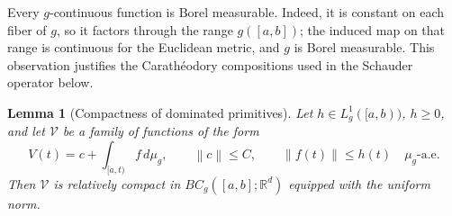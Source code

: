 \documentclass[preprint,12pt]{elsarticle}
\newenvironment{revision}{\begingroup\color{red}}{\endgroup}
\newenvironment{revision}{}{}
\newtheorem{lemma}[theorem]{Lemma}
\theoremstyle{definition}
\theoremstyle{remark}
\newcommand{\R}{\mathbb R}
\newcommand{\norm}[1]{\left\lVert#1\right\rVert}
\begin{document}
\begin{revision}
Every \(g\)-continuous function is Borel measurable. Indeed, it is constant on
each fiber of \(g\), so it factors through the range \(g([a,b])\); the induced
map on that range is continuous for the Euclidean metric, and \(g\) is Borel
measurable. This observation justifies the Carath\'eodory compositions used in
the Schauder operator below.
\end{revision}

\begin{lemma}[Compactness of dominated primitives]\label{lem:compact-dominated-primitives}
Let $h\in L_g^1([a,b))$, $h\ge0$, and let $\mathcal V$ be a family of functions of the form
\[
 V(t)=c+\int_{[a,t)}f\,d\mu_g,
 \qquad \norm{c}\le C,
 \qquad \norm{f(t)}\le h(t)\quad\mu_g\text{-a.e.}
\]
Then $\mathcal V$ is relatively compact in $BC_g([a,b];\R^d)$ equipped with the uniform norm.
\end{lemma}
\end{document}
